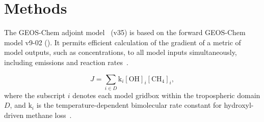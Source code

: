 \section{Methods}

The GEOS-Chem adjoint model~\cite{ref:henze2007} (v35) is based on the forward GEOS-Chem model v9-02 (\href{http://www.geos-chem.org}{}). It permits efficient calculation of the gradient of a metric of model outputs, such as concentrations, to all model inputs simultaneously, including emissions and reaction rates~\cite{ref:walker2015}.

\begin{equation}
J=\sum_{i \in D} \mathrm{k}_i \mathrm{[OH]}_i \mathrm{[CH_4]}_i,
\end{equation}
where the subscript $i$ denotes each model gridbox within the tropospheric domain $D$, and $\mathrm{k}_i$ is the temperature-dependent bimolecular rate constant for hydroxyl-driven methane loss~\citep{ref:sander2011}.
